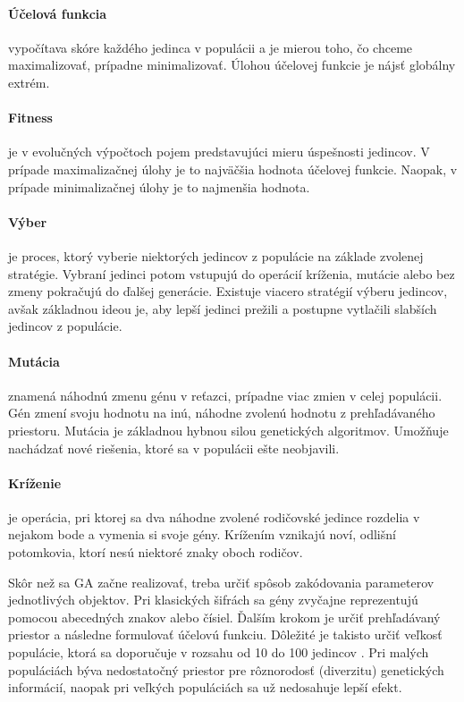 \paragraph{Účelová funkcia} vypočítava skóre každého jedinca v populácii a je mierou toho, čo chceme maximalizovať, prípadne minimalizovať.
Úlohou účelovej funkcie je nájsť globálny extrém.

\paragraph{Fitness} je v evolučných výpočtoch pojem predstavujúci mieru úspešnosti jedincov.
V prípade maximalizačnej úlohy je to najväčšia hodnota účelovej funkcie. Naopak, v prípade minimalizačnej úlohy je to najmenšia hodnota.

\paragraph{Výber} je proces, ktorý vyberie niektorých jedincov z populácie na základe zvolenej stratégie.
Vybraní jedinci potom vstupujú do operácií kríženia, mutácie alebo bez zmeny pokračujú do ďalšej generácie.
Existuje viacero stratégií výberu jedincov, avšak základnou ideou je, aby lepší jedinci prežili a postupne vytlačili slabších jedincov z populácie.

\paragraph{Mutácia} znamená náhodnú zmenu génu v reťazci, prípadne viac zmien v celej populácii.
Gén zmení svoju hodnotu na inú, náhodne zvolenú hodnotu z prehľadávaného priestoru.
Mutácia je základnou hybnou silou genetických algoritmov. Umožňuje nachádzať nové riešenia, ktoré sa v populácii ešte neobjavili.

\paragraph{Kríženie} je operácia, pri ktorej sa dva náhodne zvolené rodičovské jedince rozdelia v nejakom bode a vymenia si svoje gény.
Krížením vznikajú noví, odlišní potomkovia, ktorí nesú niektoré znaky oboch rodičov.

Skôr než sa GA začne realizovať, treba určiť spôsob zakódovania parameterov jednotlivých objektov.
Pri klasických šifrách sa gény zvyčajne reprezentujú pomocou abecedných znakov alebo čísiel.
Ďalším krokom je určiť prehľadávaný priestor a následne formulovať účelovú funkciu. Dôležité je takisto určiť veľkosť populácie,
ktorá sa doporučuje v rozsahu od 10 do 100 jedincov \cite{ev}.
Pri malých populáciách býva nedostatočný priestor pre rôznorodosť (diverzitu) genetických informácií,
naopak pri veľkých populáciách sa už nedosahuje lepší efekt.

